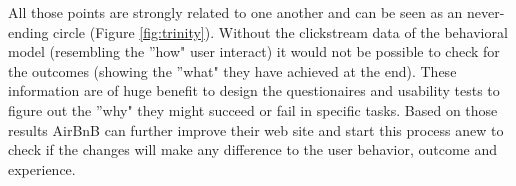 All those points are strongly related to one another and can be seen as an never-ending circle (Figure \ref{fig:trinity}). Without the clickstream data of the behavioral model (resembling the ''how" user interact) it would not be possible to check for the outcomes (showing the ''what" they have achieved at the end). These information are of huge benefit to design the questionaires and usability tests to figure out the ''why" they might succeed or fail in specific tasks. Based on those results AirBnB can further improve their web site and start this process anew to check if the changes will make any difference to the user behavior, outcome and experience. 




